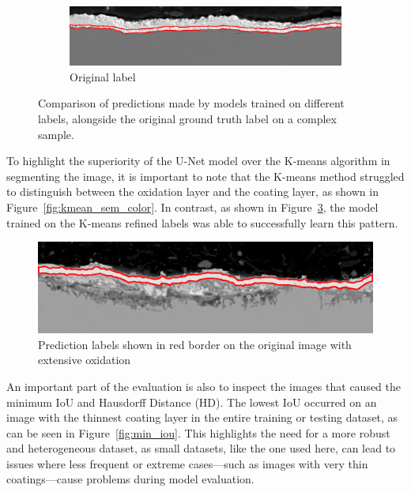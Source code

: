 \begin{figure}[H]
    \vspace{0.5cm}
    
    \begin{subfigure}[b]{0.75\linewidth}
        \centering
        \includegraphics[width=\linewidth]{PICTURES/eval/188_og.png}
        \caption{Original label}
        \label{fig:ground-truth}
    \end{subfigure}
    
    \caption{Comparison of predictions made by models trained on different labels, alongside the original ground truth label on a complex sample.}
    \label{fig:comparison}
\end{figure}




To highlight the superiority of the U-Net model over the K-means algorithm in segmenting the image, it is important to note that the K-means method struggled to distinguish between the oxidation layer and the coating layer, as shown in Figure~\ref{fig:kmean_sem_color}. In contrast, as shown in Figure~\ref{fig:149}, the model trained on the K-means refined labels was able to successfully learn this pattern.

\begin{figure}[H] 
\centering 
\includegraphics[width=0.8\linewidth]{PICTURES/eval/149(1).png} 
\caption{Prediction labels shown in red border on the original image with extensive oxidation} \label{fig:149} \end{figure}

An important part of the evaluation is also to inspect the images that caused the minimum IoU and Hausdorff Distance (HD). The lowest IoU occurred on an image with the thinnest coating layer in the entire training or testing dataset, as can be seen in Figure~\ref{fig:min_iou}. This highlights the need for a more robust and heterogeneous dataset, as small datasets, like the one used here, can lead to issues where less frequent or extreme cases—such as images with very thin coatings—cause problems during model evaluation.

